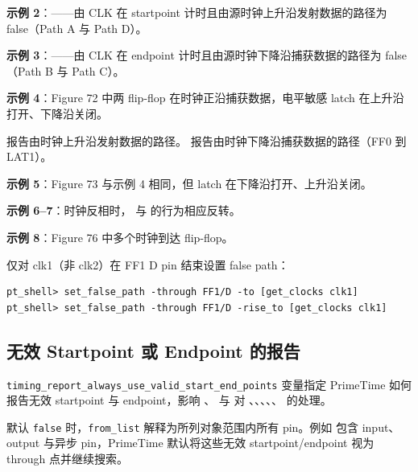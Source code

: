\textbf{示例 2}：——由 CLK 在 startpoint 计时且由源时钟上升沿发射数据的路径为 false（Path A 与 Path D）。

\textbf{示例 3}：——由 CLK 在 endpoint 计时且由源时钟下降沿捕获数据的路径为 false（Path B 与 Path C）。

\textbf{示例 4}：Figure 72 中两 flip-flop 在时钟正沿捕获数据，电平敏感 latch 在上升沿打开、下降沿关闭。


 报告由时钟上升沿发射数据的路径。 报告由时钟下降沿捕获数据的路径（FF0 到 LAT1）。

\textbf{示例 5}：Figure 73 与示例 4 相同，但 latch 在下降沿打开、上升沿关闭。


\textbf{示例 6--7}：时钟反相时， 与  的行为相应反转。

\textbf{示例 8}：Figure 76 中多个时钟到达 flip-flop。


仅对 clk1（非 clk2）在 FF1 D pin 结束设置 false path：
\begin{lstlisting}
pt_shell> set_false_path -through FF1/D -to [get_clocks clk1]
pt_shell> set_false_path -through FF1/D -rise_to [get_clocks clk1]
\end{lstlisting}

\subsection{无效 Startpoint 或 Endpoint 的报告}
\texttt{timing\_report\_always\_use\_valid\_start\_end\_points} 变量指定 PrimeTime 如何报告无效 startpoint 与 endpoint，影响 、 与  对 、、、、、 的处理。

默认 \texttt{false} 时，\texttt{from\_list} 解释为所列对象范围内所有 pin。例如  包含 input、output 与异步 pin，PrimeTime 默认将这些无效 startpoint/endpoint 视为 through 点并继续搜索。

